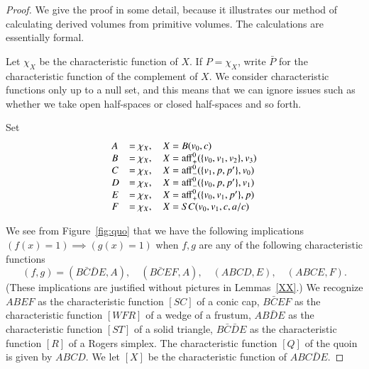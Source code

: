 \begin{proof} We give the proof in some detail, because it illustrates
our method of calculating derived volumes from primitive volumes.
The calculations are essentially formal.

Let $\chi_X$ be the characteristic
function of $X$.  If $P = \chi_X$, write $\bar P$ for the characteristic
function of the complement of $X$.  We consider characteristic functions
only up to a null set, and this means that we can ignore issues such
as whether we take open half-spaces or closed half-spaces and so forth.

Set
$$
\begin{array}{lll}
  A &= \chi_X,\quad X = B(v_0,c)\\
  B &= \chi_X,\quad X = {\operatorname{aff}}_+^0(\{v_0,v_1,v_2\},v_3)\\
  C &= \chi_X,\quad X = {\operatorname{aff}}_-^0(\{v_1,p,p'\},v_0)\\
  D &= \chi_X,\quad X = {\operatorname{aff}}_-^0(\{v_0,p,p'\},v_1)\\
  E &= \chi_X,\quad X = {\operatorname{aff}}_+^0(\{v_0,v_1,p'\},p)\\
  F &= \chi_X,\quad X = SC(v_0,v_1,c,a/c)\\
\end{array}
$$

We see from Figure~\ref{fig:quo} that we have the following implications
$(f(x)=1)\implies (g(x)=1)$ when $f,g$ are any of the following characteristic
functions
  $$
   (f,g) = (B\bar C \bar D E,A),\quad
   (B\bar C E F,A),\quad (A B C D, E),\quad (A B C E,F).
  $$
(These implications are justified without pictures in Lemmas~\ref{XX}.)
We recognize $ABEF$ as the characteristic function $[SC]$ of a
conic cap, $B\bar C E F$ as the characteristic function $[WFR]$ of a
wedge of a frustum,  $AB\bar D E$ as the characteristic function $[ST]$
of a solid triangle, $B\bar C\bar D E$ as the characteristic function $[R]$
of a Rogers simplex.  The characteristic function $[Q]$
of the quoin is given
by $A B C D$.  We let $[X]$ be the characteristic function of
$A B C \bar D E$.


\end{proof}
